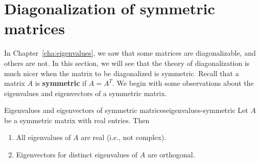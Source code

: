 \section{Diagonalization of symmetric matrices}

In Chapter~\ref{cha:eigenvalues}, we saw that some matrices are
diagonalizable, and others are not. In this section, we will see that
the theory of diagonalization is much nicer when the matrix to be
diagonalized is symmetric. Recall that a matrix $A$ is
\textbf{symmetric}%
%
 if $A=A^T$. We begin with some observations
about the eigenvalues and eigenvectors of a symmetric matrix.

\begin{lemma}{Eigenvalues and eigenvectors of symmetric matrices}{eigenvalues-symmetric}
  Let $A$ be a symmetric matrix with real entries. Then
  \begin{enumialphparenastyle}
    \begin{enumerate}
    \item All eigenvalues of $A$ are real (i.e., not complex).
    \item Eigenvectors for distinct eigenvalues of $A$ are orthogonal.
    \end{enumerate}
  \end{enumialphparenastyle}
\end{lemma}

